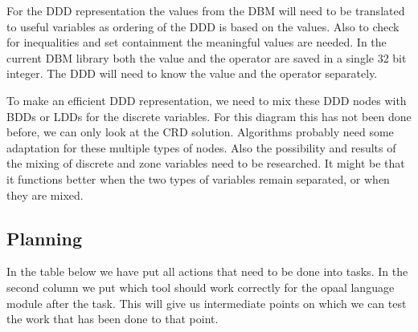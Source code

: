\documentclass[11pt]{article}
\begin{document}
For the DDD representation the values from the DBM will need to be translated to useful variables as ordering of the DDD is based on the values. Also to check for inequalities and set containment the meaningful values are needed. In the current DBM library both the value and the operator are saved in a single 32 bit integer. The DDD will need to know the value and the operator separately.

To make an efficient DDD representation, we need to mix these DDD nodes with BDDs or LDDs for the discrete variables. For this diagram this has not been done before, we can only look at the CRD solution. Algorithms probably need some adaptation for these multiple types of nodes. Also the possibility and results of the mixing of discrete and zone variables need to be researched. It might be that it functions better when the two types of variables remain separated, or when they are mixed.

\subsection{Planning}
In the table below we have put all actions that need to be done into tasks. In the second column we put which tool should work correctly for the opaal language module after the task. This will give us intermediate points on which we can test the work that has been done to that point.
\end{document}
